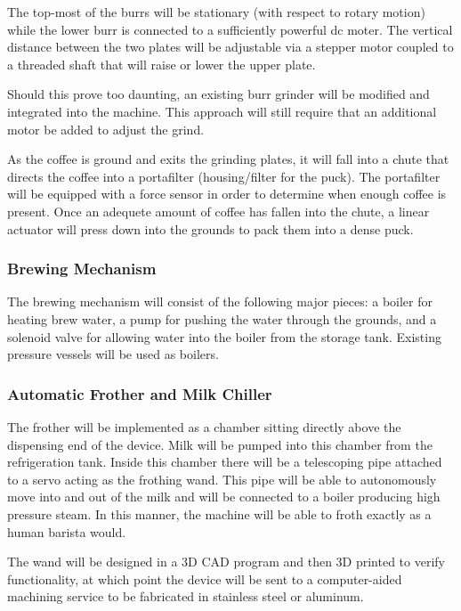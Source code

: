 \documentclass[conference]{IEEEtran}
\begin{document}
The top-most of the burrs will be stationary (with respect to rotary motion)
while the lower burr is connected to a sufficiently powerful dc moter. The
vertical distance between the two plates will be adjustable via a stepper motor coupled
to a threaded shaft that will raise or lower the upper plate.

Should this prove too daunting, an existing burr grinder will be modified
and integrated into the machine. This approach will still require that an additional
motor be added to adjust the grind.

As the coffee is ground and exits the grinding plates, it will fall into a chute
that directs the coffee into a portafilter (housing/filter for the puck). The
portafilter will be equipped with a force sensor in order to determine when
enough coffee is present. Once an adequete amount of coffee has fallen into the
chute, a linear actuator will press down into the grounds to pack them into a dense puck.

\subsubsection{Brewing Mechanism}
The brewing mechanism will consist of the following major pieces: a boiler for
heating brew water, a pump for pushing the water through the
grounds, and a solenoid valve for allowing water into the boiler from the storage tank.
Existing pressure vessels will be used as boilers.


\subsubsection{Automatic Frother and Milk Chiller}
The frother will be implemented as a chamber sitting directly above the
dispensing end of the device. Milk will be pumped into this chamber from the
refrigeration tank. Inside this chamber there will be a telescoping pipe
attached to a servo acting as the frothing wand. This pipe will be able to
autonomously move into and out of the milk and will be connected to a boiler
producing high pressure steam. In this manner, the machine will be able to froth
exactly as a human barista would.

The wand will be designed in a 3D CAD program and then 3D printed to verify
functionality, at which point the device will be sent to a computer-aided
machining service to be fabricated in stainless steel or aluminum.
\end{document}

